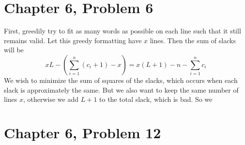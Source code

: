 \documentclass[12pt]{article}
\begin{document}
\pagebreak

\section*{Chapter 6, Problem 6}

First, greedily try to fit as many words as possible on each line such that it still remains valid. Let this
greedy formatting have \(x\) lines. Then the sum of slacks will be
\[xL-\left(\sum_{i=1}^n (c_i + 1) - x\right) = x(L+1)-n-\sum_{i=1}^n c_i\]
We wish to minimize the sum of squares of the slacks, which occurs when each slack is approximately the same.
But we also want to keep the same number of lines \(x\), otherwise we add \(L+1\) to the total slack, which is
bad. So we 

\pagebreak

\section*{Chapter 6, Problem 12}
\end{document}
